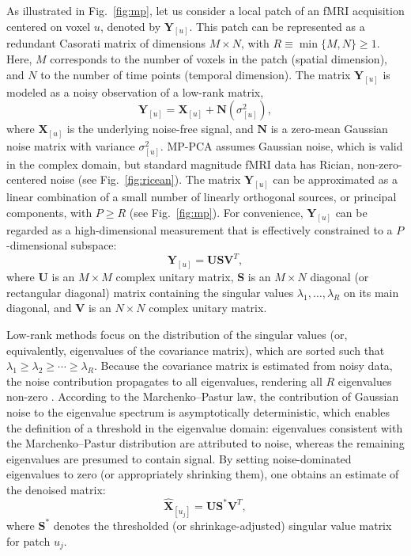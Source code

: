 As illustrated in Fig.~\ref{fig:mp}, let us consider a local patch of an fMRI acquisition centered on voxel $u$, denoted by $\mathbf{Y}_{[u]}$. This patch can be represented as a redundant Casorati matrix of dimensions $M \times N$, with $R \equiv \min\{M, N\} \geqslant 1$. Here, $M$ corresponds to the number of voxels in the patch (spatial dimension), and $N$ to the number of time points (temporal dimension). The matrix $\mathbf{Y}_{[u]}$ is modeled as a noisy observation of a low-rank matrix,
\[
\mathbf{Y}_{[u]} = \mathbf{X}_{[u]} + \mathbf{N}(\sigma^2_{[u]}),
\]
where $\mathbf{X}_{[u]}$ is the underlying noise-free signal, and $\mathbf{N}$ is a zero-mean Gaussian noise matrix with variance $\sigma^2_{[u]}$. MP-PCA assumes Gaussian noise, which is valid in the complex domain, but standard magnitude fMRI data has Rician, non-zero-centered noise (see Fig.~\ref{fig:ricean}). The matrix $\mathbf{Y}_{[u]}$ can be approximated as a linear combination of a small number of linearly orthogonal sources, or principal components, with $P \geqslant R$ (see Fig.~\ref{fig:mp}). For convenience, $\mathbf{Y}_{[u]}$ can be regarded as a high-dimensional measurement that is effectively constrained to a $P$-dimensional subspace:
\begin{equation}\label{eq:svd}
    \mathbf{Y}_{[u]} = \mathbf{U}\mathbf{S}\mathbf{V}^T,
\end{equation}
where $\mathbf{U}$ is an $M \times M$ complex unitary matrix, $\mathbf{S}$ is an $M \times N$ diagonal (or rectangular diagonal) matrix containing the singular values $\lambda_1, \ldots, \lambda_R$ on its main diagonal, and $\mathbf{V}$ is an $N \times N$ complex unitary matrix.

Low-rank methods focus on the distribution of the singular values (or, equivalently, eigenvalues of the covariance matrix), which are sorted such that $\lambda_1 \geq \lambda_2 \geq \cdots \geq \lambda_R$. Because the covariance matrix is estimated from noisy data, the noise contribution propagates to all eigenvalues, rendering all $R$ eigenvalues non-zero \citep{marcenkoDistributionEigenvaluesSets1967a}. According to the Marchenko–Pastur law, the contribution of Gaussian noise to the eigenvalue spectrum is asymptotically deterministic, which enables the definition of a threshold in the eigenvalue domain: eigenvalues consistent with the Marchenko–Pastur distribution are attributed to noise, whereas the remaining eigenvalues are presumed to contain signal. By setting noise-dominated eigenvalues to zero (or appropriately shrinking them), one obtains an estimate of the denoised matrix:
\begin{equation}
    \hat{\mathbf{X}}_{[u_j]} = \mathbf{U}\mathbf{S}^*\mathbf{V}^T,
\end{equation}
where $\mathbf{S}^*$ denotes the thresholded (or shrinkage-adjusted) singular value matrix for patch $u_j$.

